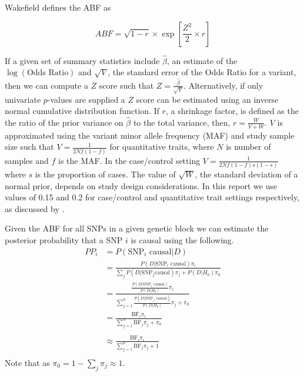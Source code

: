 \documentclass[a4paper,11pt]{report}
\begin{document}
Wakefield defines the ABF as

\begin{equation}
	ABF =  \sqrt{1 - r} \times \exp{\left[\frac{Z^{2}}{2} \times r\right]}
\end{equation}

If a given set of summary statistics include $\hat{\beta}$, an  estimate of the $\log(\text{Odds Ratio})$ and $\sqrt{V}$, the standard error of the Odds Ratio for a variant, then we can compute a $Z$ score such that $Z= \frac{\hat{\beta}}{\sqrt{V}}$. Alternatively, if only univariate $p$-values are supplied a $Z$ score can be estimated using an inverse normal cumulative distribution function. If $r$, a shrinkage factor, is defined as the  the ratio of the prior variance on $\hat{\beta}$ to the total variance, then, $r = \frac{W}{V + W}$. $V$ is approximated using the variant minor allele frequency (MAF) and study sample size such that $V=\frac{1}{2Nf(1-f)}$ for quantitative traits, where $N$ is number of samples and $f$ is the MAF. In the case/control setting $V=\frac{1}{2Nf(1-f)s(1-s)}$ where $s$ is the proportion of cases. The value of $\sqrt{W}$, the standard deviation of a normal prior, depends on study design considerations. In this report we use values of 0.15 and 0.2 for  case/control  and quantitative trait settings  respectively, as discussed by \citet{GiambartolomeiVukcevicSchadtEtAl2014}.

Given the ABF for all SNPs in a given genetic block we can estimate the posterior probability that a SNP $i$  is causal using the following. 
\begin{equation}
\label{form:bf_derivation}
\begin{split}
	PP_{i}& = P(\text{SNP}_{i}\text{ causal} | D)\\
	& = \frac{P(D | \text{SNP}_{i} \text{ causal})\pi_{i}}{\sum_{j}P(D | \text{SNP}_{j}\text{causal})\pi_{j} + P(D | H_{0})\pi_0}\\
	& = \frac{
				\frac{
					P(D | \text{SNP}_{i}\text{ causal})
				}
				{
					P(D|H_{0})
				}\pi_{i}
		}
		{
				\sum_{j=1}^n\frac{
					P(D | \text{SNP}_{j}\text{ causal})
				}
				{
					P(D|H_{0})
				}\pi_{j}  + \pi_0
		}	\\
	& = \frac{
		\text{BF}_{i}\pi_{i}
	}
	{
	\sum_{j=1}^n\text{BF}_{j}\pi_{j} + \pi_{0}
	} \\	
	\\
	& \approx \frac{
		\text{BF}_{i}\pi_{i}
	}
	{
	\sum_{j=1}^n\text{BF}_{j}\pi_{j} + 1
	} \\
\end{split}
\end{equation}
Note that as $\pi_{0} = 1-\sum_{j}\pi_{j} \approx 1$. 
\end{document}
